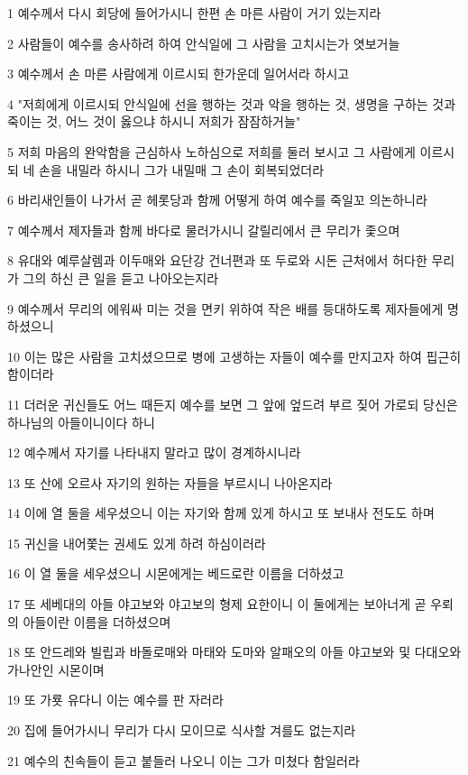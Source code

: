 \par 1 예수께서 다시 회당에 들어가시니 한편 손 마른 사람이 거기 있는지라
\par 2 사람들이 예수를 송사하려 하여 안식일에 그 사람을 고치시는가 엿보거늘
\par 3 예수께서 손 마른 사람에게 이르시되 한가운데 일어서라 하시고
\par 4 "저희에게 이르시되 안식일에 선을 행하는 것과 악을 행하는 것, 생명을 구하는 것과 죽이는 것, 어느 것이 옳으냐 하시니 저희가 잠잠하거늘"
\par 5 저희 마음의 완악함을 근심하사 노하심으로 저희를 둘러 보시고 그 사람에게 이르시되 네 손을 내밀라 하시니 그가 내밀매 그 손이 회복되었더라
\par 6 바리새인들이 나가서 곧 헤롯당과 함께 어떻게 하여 예수를 죽일꼬 의논하니라
\par 7 예수께서 제자들과 함께 바다로 물러가시니 갈릴리에서 큰 무리가 좇으며
\par 8 유대와 예루살렘과 이두매와 요단강 건너편과 또 두로와 시돈 근처에서 허다한 무리가 그의 하신 큰 일을 듣고 나아오는지라
\par 9 예수께서 무리의 에워싸 미는 것을 면키 위하여 작은 배를 등대하도록 제자들에게 명하셨으니
\par 10 이는 많은 사람을 고치셨으므로 병에 고생하는 자들이 예수를 만지고자 하여 핍근히 함이더라
\par 11 더러운 귀신들도 어느 때든지 예수를 보면 그 앞에 엎드려 부르 짖어 가로되 당신은 하나님의 아들이니이다 하니
\par 12 예수께서 자기를 나타내지 말라고 많이 경계하시니라
\par 13 또 산에 오르사 자기의 원하는 자들을 부르시니 나아온지라
\par 14 이에 열 둘을 세우셨으니 이는 자기와 함께 있게 하시고 또 보내사 전도도 하며
\par 15 귀신을 내어쫓는 권세도 있게 하려 하심이러라
\par 16 이 열 둘을 세우셨으니 시몬에게는 베드로란 이름을 더하셨고
\par 17 또 세베대의 아들 야고보와 야고보의 형제 요한이니 이 둘에게는 보아너게 곧 우뢰의 아들이란 이름을 더하셨으며
\par 18 또 안드레와 빌립과 바돌로매와 마태와 도마와 알패오의 아들 야고보와 및 다대오와 가나안인 시몬이며
\par 19 또 가룟 유다니 이는 예수를 판 자러라
\par 20 집에 들어가시니 무리가 다시 모이므로 식사할 겨를도 없는지라
\par 21 예수의 친속들이 듣고 붙들러 나오니 이는 그가 미쳤다 함일러라
